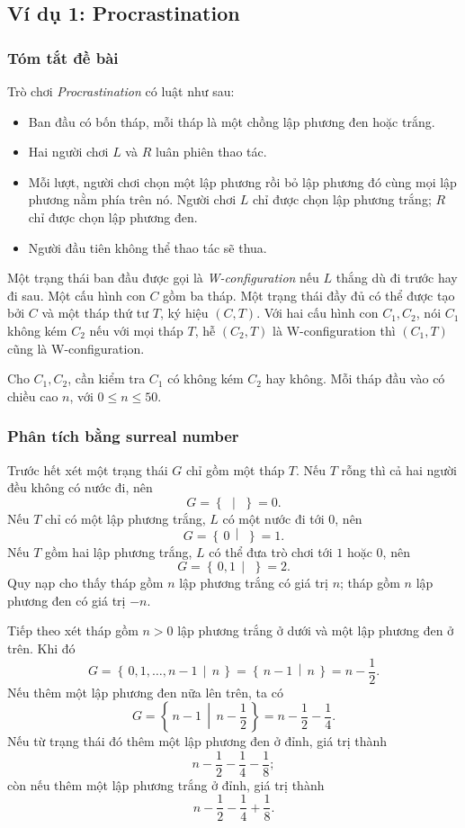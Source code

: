 \documentclass[11pt]{article}
\newcommand{\Gpos}[2]{\left\{\,#1\,\middle|\,#2\,\right\}}
\begin{document}
\subsection{Ví dụ 1: Procrastination}

\subsubsection*{Tóm tắt đề bài}

Trò chơi \emph{Procrastination} có luật như sau:
\begin{itemize}
  \item Ban đầu có bốn tháp, mỗi tháp là một chồng lập phương đen hoặc trắng.
  \item Hai người chơi \(L\) và \(R\) luân phiên thao tác.
  \item Mỗi lượt, người chơi chọn một lập phương rồi bỏ lập phương đó cùng mọi
  lập phương nằm phía trên nó. Người chơi \(L\) chỉ được chọn lập phương
  trắng; \(R\) chỉ được chọn lập phương đen.
  \item Người đầu tiên không thể thao tác sẽ thua.
\end{itemize}

Một trạng thái ban đầu được gọi là \emph{W-configuration} nếu \(L\) thắng dù đi
trước hay đi sau. Một cấu hình con \(C\) gồm ba tháp. Một trạng thái đầy đủ có
thể được tạo bởi \(C\) và một tháp thứ tư \(T\), ký hiệu \((C,T)\). Với hai cấu
hình con \(C_1,C_2\), nói \(C_1\) không kém \(C_2\) nếu với mọi tháp \(T\),
hễ \((C_2,T)\) là W-configuration thì \((C_1,T)\) cũng là W-configuration.

Cho \(C_1,C_2\), cần kiểm tra \(C_1\) có không kém \(C_2\) hay không. Mỗi tháp
đầu vào có chiều cao \(n\), với \(0\le n\le 50\).

\subsubsection*{Phân tích bằng surreal number}

Trước hết xét một trạng thái \(G\) chỉ gồm một tháp \(T\). Nếu \(T\) rỗng thì
cả hai người đều không có nước đi, nên
\[
  G=\Gpos{}{}=0.
\]
Nếu \(T\) chỉ có một lập phương trắng, \(L\) có một nước đi tới \(0\), nên
\[
  G=\Gpos{0}{}=1.
\]
Nếu \(T\) gồm hai lập phương trắng, \(L\) có thể đưa trò chơi tới \(1\) hoặc
\(0\), nên
\[
  G=\Gpos{0,1}{}=2.
\]
Quy nạp cho thấy tháp gồm \(n\) lập phương trắng có giá trị \(n\); tháp gồm
\(n\) lập phương đen có giá trị \(-n\).

Tiếp theo xét tháp gồm \(n>0\) lập phương trắng ở dưới và một lập phương đen ở
trên. Khi đó
\[
  G=\Gpos{0,1,\ldots,n-1}{n}
   =\Gpos{n-1}{n}
   =n-\frac12.
\]
Nếu thêm một lập phương đen nữa lên trên, ta có
\[
  G=\Gpos{n-1}{n-\frac12}
   =n-\frac12-\frac14.
\]
Nếu từ trạng thái đó thêm một lập phương đen ở đỉnh, giá trị thành
\[
  n-\frac12-\frac14-\frac18;
\]
còn nếu thêm một lập phương trắng ở đỉnh, giá trị thành
\[
  n-\frac12-\frac14+\frac18.
\]
\end{document}

